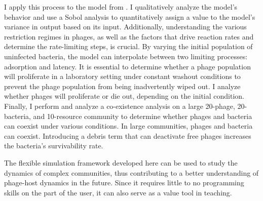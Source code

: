 \documentclass[11pt, oneside, final]{Thesis}
\begin{document}
{    I apply this process to the model from \citet{gengUsingBacterialPopulation2024}. 
    I qualitatively analyze the model's behavior and use a Sobol analysis to quantitatively assign a value to the model's variance in output based on its input. 
    Additionally, understanding the various restriction regimes in phages, as well as the factors that drive reaction rates and determine the rate-limiting steps, is crucial.
    By varying the initial population of uninfected bacteria, the model can interpolate between two limiting processes: adsorption and latency. 
    It is essential to determine whether a phage population will proliferate in a laboratory setting under constant washout conditions to prevent the phage population from being inadvertently wiped out. 
    I analyze whether phages will proliferate or die out, depending on the initial condition. 
    Finally, I perform and analyze a co-existence analysis on a large 20-phage, 20-bacteria, and 10-resource community to determine whether phages and bacteria can coexist under various conditions. 
    In large communities, phages and bacteria can coexist. 
    Introducing a debris term  that can deactivate free phages increases the bacteria's survivability rate.

    The flexible simulation framework developed here can be used to study the dynamics of complex communities, thus contributing to a better understanding of phage-host dynamics in the future. 
    Since it requires little to no programming skills on the part of the user, it can also serve as a value tool in teaching. 

}
\clearpage 

\end{document}
